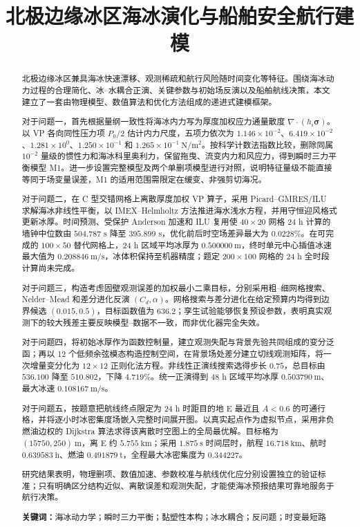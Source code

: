 \documentclass[UTF8,fontset=none]{ctexart}
\title{\textbf{北极边缘冰区海冰演化与船舶安全航行建模}}
\author{}
\date{}
\newcommand{\vect}[1]{\boldsymbol{#1}}
\begin{document}
\setcounter{page}{1}
\maketitle
\vspace{-0.95cm}

\renewcommand{\abstractname}{\sihao 摘\quad 要}
\begin{abstract}\xiaosihao
北极边缘冰区兼具海冰快速漂移、观测稀疏和航行风险随时间变化等特征。围绕海冰动力过程的合理简化、冰--水耦合正演、关键参数与初始场反演以及船舶航线决策，本文建立了一套由物理模型、数值算法和优化方法组成的递进式建模框架。

对于问题一，首先根据量纲一致性将海冰内力写为厚度加权应力通量散度 $\nabla\cdot(h_i\vect\sigma)$。以 VP 各向同性压力项 $P_0/2$ 估计内力尺度，五项力依次为 $1.146\times10^{-2}$、$6.419\times10^{-2}$、$1.281\times10^0$、$1.250\times10^{-1}$ 和 $1.265\times10^{-1}\ \mathrm{N/m^2}$。按科学计数法指数比较，删除同属 $10^{-2}$ 量级的惯性力和海冰科里奥利力，保留拖曳、流变内力和风应力，得到瞬时三力平衡模型 M1。进一步设置完整模型及两个单删项模型进行对照，说明特征量级不能直接等同于场变量误差，M1 的适用范围需限定在缓变、非强剪切海况。

对于问题二，在 C 型交错网格上离散厚度加权 VP 算子，采用 Picard--GMRES/ILU 求解海冰非线性平衡，以 IMEX--Helmholtz 方法推进海水浅水方程，并用守恒迎风格式更新冰厚。时间预测、受保护 Anderson 加速和 ILU 复用使 $40\times20$ 网格 24 h 计算的墙钟中位数由 $504.787$ s 降至 $395.899$ s，优化前后时空场差异最大为 $0.0228\%$。在可完成的 $100\times50$ 替代网格上，24 h 区域平均冰厚为 $0.500000\ \mathrm m$，终时单元中心插值冰速最大值为 $0.208846\ \mathrm{m/s}$，冰体积保持至机器精度；题定 $200\times100$ 网格的 24 h 全时段计算尚未完成。

对于问题三，构造考虑固壁观测误差的加权最小二乘目标，分别采用粗--细网格搜索、Nelder--Mead 和差分进化反演 $(C_d,\alpha)$。网格搜索与差分进化在给定预算内均得到边界候选 $(0.015,0.5)$，目标函数值为 $636.2$；孪生试验能够恢复预设参数，表明真实观测下的较大残差主要反映模型--数据不一致，而非优化器完全失效。

对于问题四，将初始冰厚作为函数控制量，建立观测失配与背景先验共同组成的变分泛函；再以 12 个低频余弦模态构造控制空间，在背景场处差分建立切线观测矩阵，将一次增量变分化为 $12\times12$ 正则化法方程。非线性正演线搜索选得步长 $0.75$，总目标由 $536.100$ 降至 $510.802$，下降 $4.719\%$。统一正演得到 48 h 区域平均冰厚 $0.503790\ \mathrm m$、最大冰速 $0.108167\ \mathrm{m/s}$。

对于问题五，按题意把航线终点限定为 24 h 时距目的地 E 最近且 $A<0.6$ 的可通行格，并将逐小时冰密集度场嵌入完整时间展开图。以真实起点作为虚拟节点，采用非负燃油边权的 Dijkstra 算法求得该离散时空图上的全局最优解。目标格为 $(15750,250)\ \mathrm m$，离 E 约 $5.755\ \mathrm{km}$；采用 $1.875\ \mathrm s$ 时间层时，航程 $16.718\ \mathrm{km}$、航时 $0.639583\ \mathrm h$、燃油 $0.491879\ \mathrm t$，全程最大冰密集度为 $0.344227$。

研究结果表明，物理删项、数值加速、参数校准与航线优化应分别设置独立的验证标准；只有明确区分结构近似、离散误差和观测失配，才能使海冰预报结果可靠地服务于航行决策。

\textbf{关键词：}\quad 海冰动力学；瞬时三力平衡；黏塑性本构；冰水耦合；反问题；时变最短路
\end{abstract}
\end{document}

